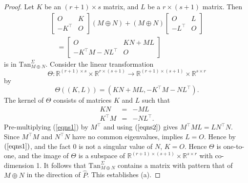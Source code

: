 \documentclass[preprint,12pt]{elsarticle}
\newcommand{\trans  }{^\top}
\newcommand{\mat}{\mathbb{R}}
\begin{document}
\begin{proof}

Let $K$ be an $(r+1)\times s$ matrix, and $L$ be a
$r \times (s+1)$ matrix.
Then 
\[ 
\renewcommand*{\arraystretch}{1.25}
\begin{array}{l}
\left[ 
\begin{array}{c|c}
O & K\\ \hline 
-K\trans & O \end{array} \right] 
(M\oplus N) +
(M\oplus N) 
\left[ 
\begin{array}{c|c}
O & L\\ \hline 
-L\trans &  O \end{array} 
\right]  \\ 
\quad  =  \left[ 
\begin{array}{c|c}
O & KN+ML \\ \hline
-K\trans M -NL\trans & O 
\end{array} 
\right] 
\end{array}
\]
is in 
$\mbox{Tan}^{\Sigma}_{M\oplus N}$. Consider the linear transformation  
\[ \Theta \colon  \mat^{(r+1)\times s} \times \mat^{r\times (s+1)} \rightarrow \mat^{(r+1)\times (s+1)} \times \mat^{s\times r}\]
 by 
 \[ \Theta((K,L))= (KN+ML, -K\trans M-NL\trans). \]
 The kernel of $\Theta$ consists 
 of matrices $K$ and $L$ such that 
 \begin{eqnarray}
 \label{eqns1}
     KN& = &-ML \\
      \label{eqns2}
     K\trans M & =& -NL\trans .
 \end{eqnarray}
Pre-multiplying (\ref{eqns1}) by $M\trans$ and using $(\ref{eqns2})$
gives 
$M\trans ML= L N\trans N$.
Since $M\trans M$ and $N\trans N$ have no common eigenvalues, 
 implies $L=O$.
Hence by $(\ref{eqns1})$, and the fact $0$ is not a singular value of $N$, 
$K=O$. Hence $\Theta$ is one-to-one, and the image
of $\Theta$ is a subspace of $\mat^{(r+1)\times (s+1)} \times \mat^{s\times r}$
with co-dimension 1.
It follows that 
$\mbox{Tan}^{\Sigma}_{M\oplus N}$
contains a matrix with pattern  that of $M\oplus N$ in the direction of $\widehat{P}$.
This establishes (a). 


\end{proof}
\end{document}
